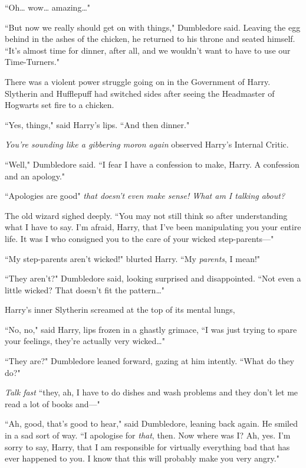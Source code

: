 ``Oh{\ldots} wow{\ldots} amazing{\ldots}"

``But now we really should get on with things," Dumbledore said. Leaving the egg behind in the ashes of the chicken, he returned to his throne and seated himself. ``It's almost time for dinner, after all, and we wouldn't want to have to use our Time-Turners."

There was a violent power struggle going on in the Government of Harry. Slytherin and Hufflepuff had switched sides after seeing the Headmaster of Hogwarts set fire to a chicken.

``Yes, things," said Harry's lips. ``And then dinner."

\emph{You're sounding like a gibbering moron again} observed Harry's Internal Critic.

``Well," Dumbledore said. ``I fear I have a confession to make, Harry. A confession and an apology."

``Apologies are good" \emph{that doesn't even make sense! What am I talking about?}

The old wizard sighed deeply. ``You may not still think so after understanding what I have to say. I'm afraid, Harry, that I've been manipulating you your entire life. It was I who consigned you to the care of your wicked step-parents—"

``My step-parents aren't wicked!" blurted Harry. ``My \emph{parents}, I mean!"

``They aren't?" Dumbledore said, looking surprised and disappointed. ``Not even a little wicked? That doesn't fit the pattern{\ldots}"

Harry's inner Slytherin screamed at the top of its mental lungs, \emph{}

``No, no," said Harry, lips frozen in a ghastly grimace, ``I was just trying to spare your feelings, they're actually very wicked{\ldots}"

``They are?" Dumbledore leaned forward, gazing at him intently. ``What do they do?"

\emph{Talk fast} ``they, ah, I have to do dishes and wash problems and they don't let me read a lot of books and—"

``Ah, good, that's good to hear," said Dumbledore, leaning back again. He smiled in a sad sort of way. ``I apologise for \emph{that}, then. Now where was I? Ah, yes. I'm sorry to say, Harry, that I am responsible for virtually everything bad that has ever happened to you. I know that this will probably make you very angry."


